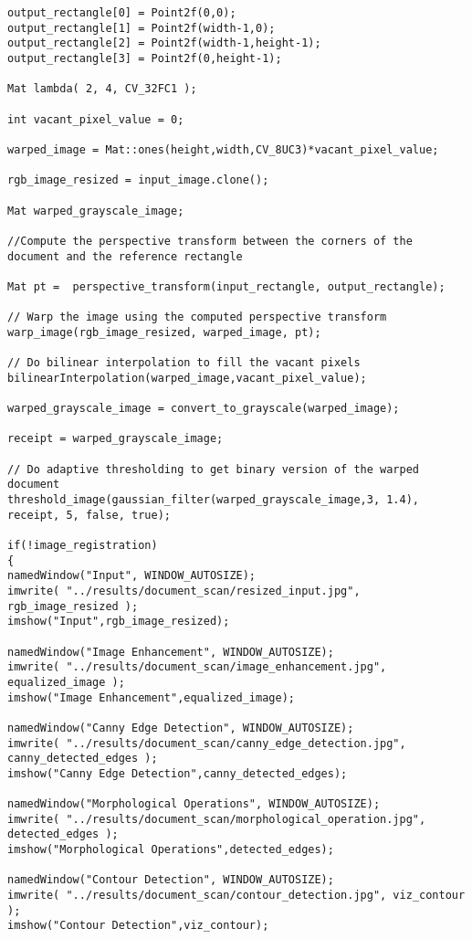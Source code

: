 \begin{lstlisting}
output_rectangle[0] = Point2f(0,0);
output_rectangle[1] = Point2f(width-1,0);
output_rectangle[2] = Point2f(width-1,height-1);
output_rectangle[3] = Point2f(0,height-1);

Mat lambda( 2, 4, CV_32FC1 );

int vacant_pixel_value = 0;

warped_image = Mat::ones(height,width,CV_8UC3)*vacant_pixel_value;

rgb_image_resized = input_image.clone();

Mat warped_grayscale_image;

//Compute the perspective transform between the corners of the document and the reference rectangle

Mat pt =  perspective_transform(input_rectangle, output_rectangle);

// Warp the image using the computed perspective transform
warp_image(rgb_image_resized, warped_image, pt);

// Do bilinear interpolation to fill the vacant pixels
bilinearInterpolation(warped_image,vacant_pixel_value);

warped_grayscale_image = convert_to_grayscale(warped_image);

receipt = warped_grayscale_image;

// Do adaptive thresholding to get binary version of the warped document
threshold_image(gaussian_filter(warped_grayscale_image,3, 1.4), receipt, 5, false, true);

if(!image_registration)
{
namedWindow("Input", WINDOW_AUTOSIZE);
imwrite( "../results/document_scan/resized_input.jpg", rgb_image_resized );
imshow("Input",rgb_image_resized);

namedWindow("Image Enhancement", WINDOW_AUTOSIZE);
imwrite( "../results/document_scan/image_enhancement.jpg", equalized_image );
imshow("Image Enhancement",equalized_image);  

namedWindow("Canny Edge Detection", WINDOW_AUTOSIZE);
imwrite( "../results/document_scan/canny_edge_detection.jpg", canny_detected_edges );
imshow("Canny Edge Detection",canny_detected_edges);  

namedWindow("Morphological Operations", WINDOW_AUTOSIZE);
imwrite( "../results/document_scan/morphological_operation.jpg", detected_edges );
imshow("Morphological Operations",detected_edges);  

namedWindow("Contour Detection", WINDOW_AUTOSIZE);
imwrite( "../results/document_scan/contour_detection.jpg", viz_contour );
imshow("Contour Detection",viz_contour);


\end{lstlisting}
